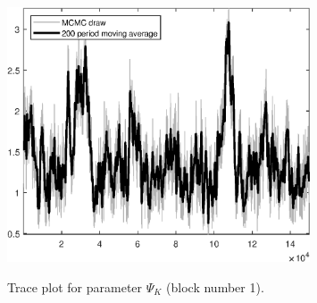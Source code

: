 \begin{figure}[H]
\centering
  \includegraphics[width=0.8\textwidth]{BRS_gen/graphs/TracePlot_Psi_K_blck_1}\\
    \caption{Trace plot for parameter ${\Psi_K}$ (block number 1).}
\end{figure}
